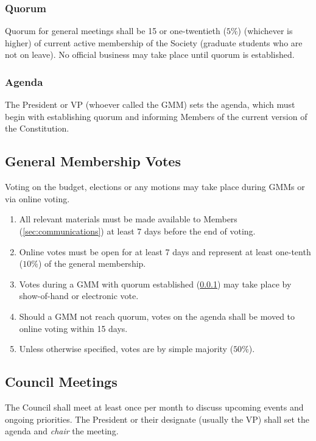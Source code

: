 \subsubsection{Quorum}\label{sec:quorum}
Quorum for general meetings shall be 15 or one-twentieth ($5\%$) (whichever is
higher) of current active membership of the Society (graduate students who are
not on leave). No official business may take place until quorum is established.

\subsubsection{Agenda}
The President or VP (whoever called the GMM) sets the agenda, which must begin
with establishing quorum and informing Members of the current version of the
Constitution.

\subsection{General Membership Votes}\label{sec:voting}
Voting on the budget, elections or any motions may take place during GMMs or
via online voting.

\begin{enumerate}
      \item All relevant materials must be made available to Members
            (\ref{sec:communications}) at least 7 days before the end of voting.
      \item Online votes must be open for at least 7 days and represent at least one-tenth
            ($10\%$) of the general membership.
      \item Votes during a GMM with quorum established (\ref{sec:quorum}) may take place by
            show-of-hand or electronic vote.
      \item Should a GMM not reach quorum, votes on the agenda shall be moved to online
            voting within 15 days.
      \item Unless otherwise specified, votes are by simple majority ($50\%$).
\end{enumerate}

\subsection{Council Meetings}\label{sec:council-meetings}
The Council shall meet at least once per month to discuss upcoming events and
ongoing priorities. The President or their designate (usually the VP) shall set
the agenda and \textit{chair} the meeting.

